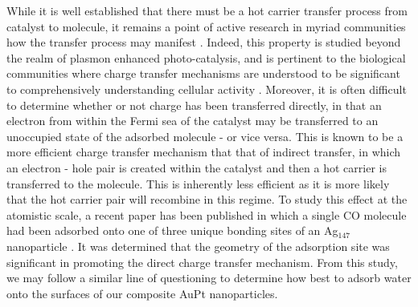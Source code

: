 While it is well established that there must be a hot carrier transfer process from catalyst to molecule, it remains a point of active research in myriad communities how the transfer process may manifest \cite{Furube2017}. Indeed, this property is studied beyond the realm of plasmon enhanced photo-catalysis, and is pertinent to the biological communities \cite{Giannini2019} where charge transfer mechanisms are understood to be significant to comprehensively understanding cellular activity \cite{doi:10.1021/acs.chemrev.5b00298}. Moreover, it is often difficult to determine whether or not charge has been transferred directly, in that an electron from within the Fermi sea of the catalyst may be transferred to an unoccupied state of the adsorbed molecule - or vice versa. This is known to be a more efficient charge transfer mechanism that that of indirect transfer, in which an electron - hole pair is created within the catalyst and then a hot carrier is transferred to the molecule. This is inherently less efficient as it is more likely that the hot carrier pair will recombine in this regime. To study this effect at the atomistic scale, a recent paper has been published in which a single CO molecule had been adsorbed onto one of three unique bonding sites of an Ag$_{147}$ nanoparticle \cite{AuTRansfer}. It was determined that the geometry of the adsorption site was significant in promoting the direct charge transfer mechanism. From this study, we may follow a similar line of questioning to determine how best to adsorb water onto the surfaces of our composite AuPt nanoparticles.


